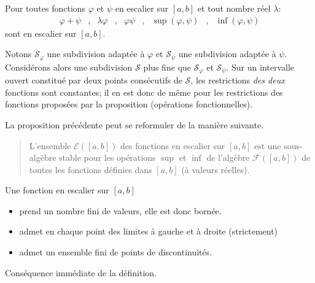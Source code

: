 \begin{propn} \label{prop:escal_op}
Pour toutes fonctions $\varphi$ et $\psi$ en escalier sur $[a,b]$  et tout nombre réel $\lambda$:
\begin{align*}
 \varphi + \psi &,& \lambda \varphi &,& \varphi\psi &,& \sup(\varphi,\psi) &,& \inf(\varphi,\psi)
\end{align*}
sont  en escalier sur $[a,b]$.
\end{propn}
\begin{demo}
 Notons $\mathcal S_\varphi$ une subdivision adaptée à $\varphi$ et $\mathcal S_\psi$ une subdivision adaptée à $\psi$. Considérons alors une subdivision $\mathcal S$ plus fine que $\mathcal S_\varphi$ et $\mathcal S_\psi$. Sur un intervalle ouvert constitué par deux points consécutifs de $\mathcal S$, les restrictions \emph{des deux} fonctions sont constantes; il en est donc de même pour les restrictions des fonctions proposées par la proposition (opérations fonctionnelles).
\end{demo}
\begin{rem}
 La proposition précédente peut se reformuler de la manière suivante.
\begin{quote}
 L'ensemble $\mathcal E ([a,b])$ des fonctions en escalier sur $[a,b]$ est une sous-algèbre stable pour les opérations $\sup$ et $\inf$ de l'algèbre $\mathcal F ([a,b])$ de toutes les fonctions définies dans $[a,b]$ (à valeurs réelles).
\end{quote}
\end{rem}
\begin{propn}
 Une fonction en escalier sur $[a,b]$
\begin{itemize}
 \item prend un nombre fini de valeurs, elle est donc bornée.
 \item admet en chaque point des limites à gauche et à droite (strictement)
 \item admet un ensemble fini de points de discontinuités.
\end{itemize}
\end{propn}
\begin{demo}
 Conséquence immédiate de la définition.
\end{demo}

